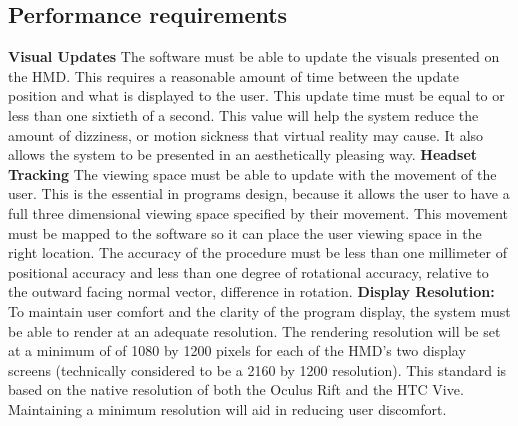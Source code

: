 \documentclass[onecolumn, draftclsnofoot,10pt, compsoc]{IEEEtran}
\begin{document}
\subsection{Performance requirements}
\textbf{Visual Updates}
\newline
The software must be able to update the visuals presented on the HMD. This requires a reasonable amount of time between the update position and what is displayed to the user. This update time must be equal to or less than one sixtieth of a second. This value will help the system reduce the amount of dizziness, or motion sickness that virtual reality may cause. It also allows the system to be presented in an aesthetically pleasing way.
\newline
\textbf{Headset Tracking}
\newline
The viewing space must be able to update with the movement of the user. This is the essential in programs design, because it allows the user to have a full three dimensional viewing space specified by their movement. This movement must be mapped to the software so it can place the user viewing space in the right location. The accuracy of the procedure must be less than one millimeter of positional accuracy and less than one degree of rotational accuracy, relative to the outward facing normal vector, difference in rotation.
\newline
\textbf{Display Resolution:}
\newline
To maintain user comfort and the clarity of the program display, the system must be able to render at an adequate resolution. The rendering resolution will be set at a minimum of of 1080 by 1200 pixels for each of the HMD’s two display screens (technically considered to be a 2160 by 1200 resolution). This standard is based on the native resolution of both the Oculus Rift and the HTC Vive. Maintaining a minimum resolution will aid in reducing user discomfort.
\end{document}
